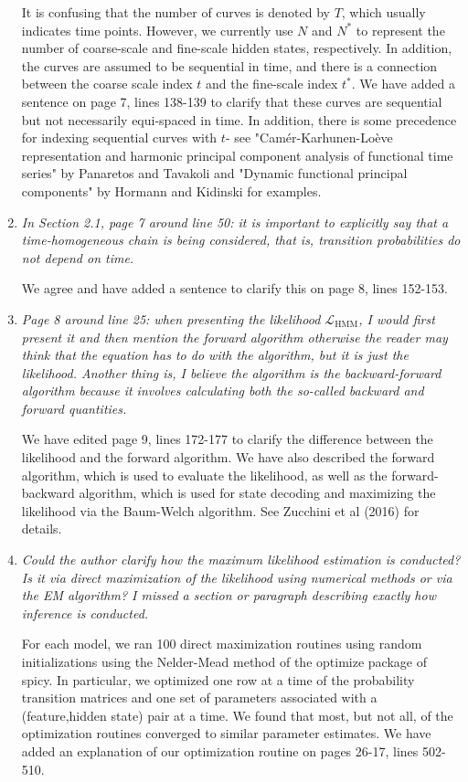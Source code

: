 \documentclass{article}
\begin{document}
\begin{enumerate}
    It is confusing that the number of curves is denoted by $T$, which usually indicates time points. However, we currently use $N$ and $N^*$ to represent the number of coarse-scale and fine-scale hidden states, respectively. In addition, the curves are assumed to be sequential in time, and there is a connection between the coarse scale index $t$ and the fine-scale index $t^*$. We have added a sentence on page 7, lines 138-139 to clarify that these curves are sequential but not necessarily equi-spaced in time. In addition, there is some precedence for indexing sequential curves with $t$- see "Cam\'er-Karhunen-Lo\`eve representation and harmonic principal component analysis of functional time series" by Panaretos and Tavakoli and "Dynamic functional principal components" by Hormann and Kidinski for examples.
    
    \item \textit{In Section 2.1, page 7 around line 50: it is important to explicitly say that a time-homogeneous chain is being considered, that is, transition probabilities do not depend on time.}
    
    We agree and have added a sentence to clarify this on page 8, lines 152-153.
    
    \item \textit{Page 8 around line 25: when presenting the likelihood $\mathcal{L}_{\text{HMM}}$, I would first present it and then mention the forward algorithm otherwise the reader may think that the equation has to do with the algorithm, but it is just the likelihood. Another thing is, I believe the algorithm is the backward-forward algorithm because it involves calculating both the so-called backward and forward quantities.}
    
    We have edited page 9, lines 172-177 to clarify the difference between the likelihood and the forward algorithm. We have also described the forward algorithm, which is used to evaluate the likelihood, as well as the forward-backward algorithm, which is used for state decoding and maximizing the likelihood via the Baum-Welch algorithm. See Zucchini et al (2016) for details.
    
    \item \textit{Could the author clarify how the maximum likelihood estimation is conducted? Is it via direct maximization of the likelihood using numerical methods or via the EM algorithm? I missed a section or paragraph describing exactly how inference is conducted. }
    
    For each model, we ran 100 direct maximization routines using random initializations using the Nelder-Mead method of the optimize package of spicy. In particular, we optimized one row at a time of the probability transition matrices and one set of parameters associated with a (feature,hidden state) pair at a time. We found that most, but not all, of the optimization routines converged to similar parameter estimates. We have added an explanation of our optimization routine on pages 26-17, lines 502-510.
    

\end{enumerate}
\end{document}
